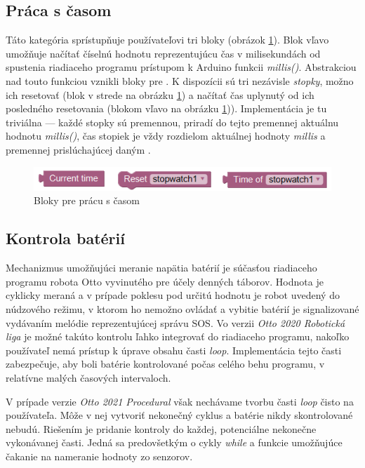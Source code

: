 \subsection{Práca s časom}
Táto kategória sprístupňuje používateľovi tri bloky (obrázok \ref{obr:time-blocks}). Blok vľavo umožňuje načítať číselnú hodnotu reprezentujúcu čas v milisekundách od spustenia riadiaceho programu prístupom k Arduino funkcii \textit{millis()}. Abstrakciou nad touto funkciou vznikli bloky pre . K dispozícii sú tri nezávisle \textit{stopky}, možno ich resetovať (blok v strede na obrázku \ref{obr:time-blocks}) a načítať čas uplynutý od ich posledného resetovania (blokom vľavo na obrázku \ref{obr:time-blocks})). Implementácia je tu triviálna --- každé stopky sú premennou,  priradí do tejto premennej aktuálnu hodnotu \textit{millis()}, čas stopiek je vždy rozdielom aktuálnej hodnoty \textit{millis} a premennej prislúchajúcej daným .

\begin{figure}[h!]
\centerline{\includegraphics[]{images/time-blocks}}
\caption[Bloky pre prácu s časom]{Bloky pre prácu s časom}
\label{obr:time-blocks}
\end{figure}


\subsection{Kontrola batérií}
Mechanizmus umožňujúci meranie napätia batérií je súčasťou riadiaceho programu robota Otto vyvinutého pre účely denných táborov. Hodnota je cyklicky meraná a v prípade poklesu pod určitú hodnotu je robot uvedený do núdzového režimu, v ktorom ho nemožno ovládať a vybitie batérií je signalizované vydávaním melódie reprezentujúcej správu SOS. Vo verzii \textit{Otto 2020 Robotická liga} je možné takúto kontrolu ľahko integrovať do riadiaceho programu, nakoľko používateľ nemá prístup k úprave obsahu časti \textit{loop}. Implementácia tejto časti zabezpečuje, aby boli batérie kontrolované počas celého behu programu, v relatívne malých časových intervaloch.

V prípade verzie \textit{Otto 2021 Procedural} však nechávame tvorbu časti \textit{loop} čisto na používateľa. Môže v nej vytvoriť nekonečný cyklus a batérie nikdy skontrolované nebudú. Riešením je pridanie kontroly do každej, potenciálne nekonečne vykonávanej časti. Jedná sa predovšetkým o cykly \textit{while} a funkcie umožňujúce čakanie na nameranie hodnoty zo senzorov.

